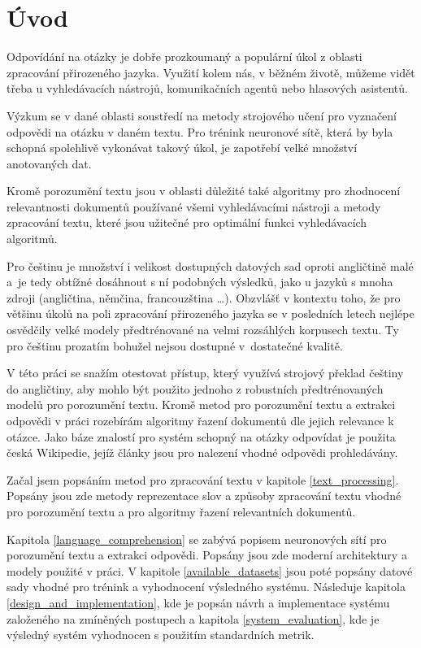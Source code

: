 
\chapter{Úvod}
Odpovídání na otázky je dobře prozkoumaný a populární úkol z oblasti zpracování přirozeného jazyka. Využití kolem nás, v běžném životě, můžeme vidět třeba u vyhledávacích nástrojů, komunikačních agentů nebo hlasových asistentů.\par 
Výzkum se v dané oblasti soustředí na metody strojového učení pro vyznačení odpovědi na otázku v daném textu. Pro trénink neuronové sítě, která by byla schopná spolehlivě vykonávat takový úkol, je zapotřebí velké množství anotovaných dat.\par 
Kromě porozumění textu jsou v oblasti důležité také algoritmy pro zhodnocení relevantnosti dokumentů používané všemi vyhledávacími nástroji a metody zpracování textu, které jsou užitečné pro optimální funkci vyhledávacích algoritmů.\par
Pro češtinu je množství i velikost dostupných datových sad oproti angličtině malé a~je tedy obtížné dosáhnout s ní podobných výsledků, jako u jazyků s mnoha zdroji (angličtina, němčina, francouzština \dots). Obzvlášť v kontextu toho, že pro většinu úkolů na poli zpracování přirozeného jazyka se v posledních letech nejlépe osvědčily velké modely předtrénované na velmi rozsáhlých korpusech textu. Ty pro češtinu prozatím bohužel nejsou dostupné v~dostatečné kvalitě.\par
V této práci se snažím otestovat přístup, který využívá strojový překlad češtiny do angličtiny, aby mohlo být použito jednoho z robustních předtrénovaných modelů pro porozumění textu. Kromě metod pro porozumění textu a extrakci odpovědi v práci rozebírám algoritmy řazení dokumentů dle jejich relevance k otázce. Jako báze znalostí pro systém schopný na otázky odpovídat je použita česká Wikipedie, jejíž články jsou pro nalezení vhodné odpovědi prohledávány.\par
Začal jsem popsáním metod pro zpracování textu v kapitole \ref{text_processing}. Popsány jsou zde metody reprezentace slov a způsoby zpracování textu vhodné pro porozumění textu a pro algoritmy řazení relevantních dokumentů.\par
Kapitola \ref{language_comprehension} se zabývá popisem neuronových sítí pro porozumění textu a extrakci odpovědi. Popsány jsou zde moderní architektury a modely použité v práci. V kapitole \ref{available_datasets} jsou poté popsány datové sady vhodné pro trénink a vyhodnocení výsledného systému.
Následuje kapitola \ref{design_and_implementation}, kde je popsán návrh a implementace systému založeného na zmíněných postupech a kapitola \ref{system_evaluation}, kde je výsledný systém vyhodnocen s použitím standardních metrik.




